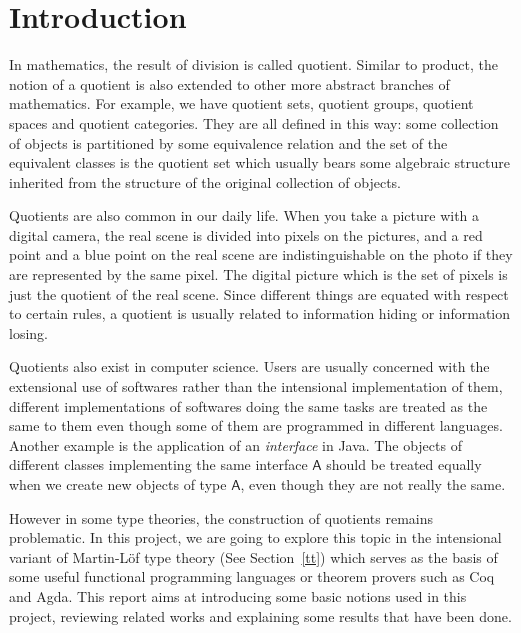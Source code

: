 \documentclass{article}
\newcommand{\Conid}[1]{\mathit{#1}}
\newcommand{\Varid}[1]{\mathit{#1}}
\renewcommand\Varid[1]{\mathord{\textsf{#1}}}
\let\Conid\Varid
\theoremstyle{definition}
\newcommand{\mltt}{Martin-L\"{o}f type theory}
\begin{document}
\section{Introduction}


In mathematics, the result of division is called quotient.
Similar to product, the notion of a quotient is also extended to other more abstract branches of mathematics.
For example, we have quotient sets, quotient groups, quotient spaces and quotient categories.
They are all defined in this way: some collection of objects is partitioned by some equivalence relation and the set of the equivalent classes
is the quotient set which usually bears some algebraic structure inherited from
the structure of the original collection of objects.

Quotients are also common in our daily life. When you take a
picture with a digital camera, the real scene is divided into pixels
on the pictures, and a red point and a blue point on the real scene are indistinguishable on
the photo if they are represented by the same pixel. The digital picture which is the set of pixels is just the
quotient of the real scene. Since different things are equated
with respect to certain rules, a quotient is usually related to
information hiding or information losing.

Quotients also exist in computer science. Users are usually concerned with the extensional use of
softwares rather than the intensional implementation of them,
different implementations of softwares doing the same tasks are
treated as the same to them even though 
some of them are programmed in different languages. Another example is
the application of an \emph{interface} in Java. The objects of different classes implementing the same
interface \ensuremath{\Conid{A}} should be treated equally when we create new objects of type \ensuremath{\Conid{A}}, even
though they are not really the same.

However in some type theories, the construction of quotients remains
problematic. In this project, we are going to explore this topic in the intensional variant of \mltt{}
(See Section~\ref{tt}) which serves as the basis of some useful
functional programming languages or theorem provers such as Coq and
Agda. This report aims at introducing some basic notions used in this
project, reviewing related works and explaining some results that have
been done. 
\end{document}

